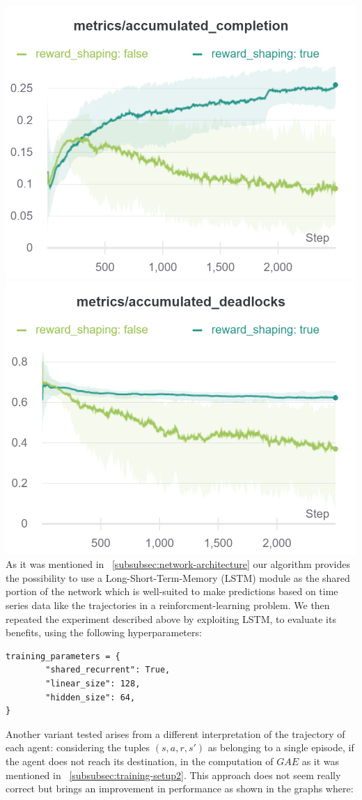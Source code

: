 \documentclass[11pt, a4paper, hidelinks]{report}
\begin{document}
\includegraphics[width=0.33\linewidth]{resources/charts_psppo_1/accumulated_completion}
\includegraphics[width=0.33\linewidth]{resources/charts_psppo_1/accumulated_deadlocks}
As it was mentioned in ~\ref{subsubsec:network-architecture} our algorithm provides the possibility to use a Long-Short-Term-Memory (LSTM) module as the shared portion of the network which is well-suited to make predictions based on time series data like the trajectories in a reinforcment-learning problem.
We then repeated the experiment described above by exploiting LSTM, to evaluate its benefits, using the following hyperparameters: 
\begin{lstlisting}[label={lst:psppo-net-init}]
training_parameters = {
        "shared_recurrent": True,
        "linear_size": 128,
        "hidden_size": 64,
}
\end{lstlisting}
Another variant tested arises from a different interpretation of the trajectory of each agent: considering the tuples $(s, a, r, s')$ as belonging to a single episode, if the agent does not reach its destination, in the computation of $GAE$ as it was mentioned in ~\ref{subsubsec:training-setup2}. 
This approach does not seem really correct but brings an improvement in performance as shown in the graphs where:
\end{document}
